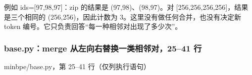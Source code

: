 \documentclass[11pt,a4paper]{article}
\newlength{\BpeDocTableWidth}
\newcommand{\BpeDocCodeInline}[1]{{\ttfamily #1}}
\newcommand{\BpeDocSubsubsection}[2]{\subsubsection{\texorpdfstring{#1}{#2}}}
\begin{document}
例如 \BpeDocCodeInline{ids}=[97,98,97]：\BpeDocCodeInline{zip} 的结果是 (97,98)、(98,97)。对 [256,256,256,256]，结果是三个相同的 (256,256)，因此计数为 3。这里没有做任何合并，也没有决定新 \BpeDocCodeInline{token} 编号。它只负责回答“每一种相邻对出现了多少次”。


\BpeDocSubsubsection{\BpeDocCodeInline{base.\allowbreak{}py}：\BpeDocCodeInline{merge} 从左向右替换一类相邻对，25–41 行}{base.py：merge 从左向右替换一类相邻对，25–41 行}


\begingroup\fontsize{8.9}{12.2}\selectfont{}
\setlength{\BpeDocTableWidth}{\dimexpr\linewidth-6\tabcolsep\relax}
\renewcommand{\arraystretch}{1.08}
{\small \BpeDocCodeInline{minbpe/\allowbreak{}base.\allowbreak{}py}，第 25–41 行（仅列执行语句）}
\end{document}
